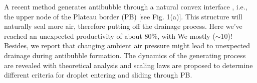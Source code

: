 \documentclass[%
 preprint,
 superscriptaddress,
 amsmath,amssymb,
 aps, prl,
]{revtex4-2}
\begin{document}
{    A recent method generates antibubble through a natural convex interface \cite{Bai2016foammethod}, i.e., the upper node of the Plateau border (PB) [see Fig. 1(a)]. This structure will naturally seal more air, therefore putting off the drainage process. Here we've reached an unexpected productivity of about 80\%, with We mostly ($\sim 10$)!  Besides, we report that changing ambient air pressure might lead to unexpected drainage during antibubble formation. The dynamics of the generating process are revealed with theoretical analysis and scaling laws are proposed to determine different criteria for droplet entering and sliding through PB.\par
    }
\end{document}
